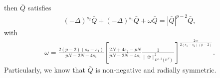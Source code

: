 \documentclass[12pt,a4paper,reqno]{amsart}
\numberwithin{equation}{section}
\begin{document}
then $\bar{Q}$ satisfies
\begin{equation*}
\begin{aligned}
(-\Delta)^{s_{2}}\bar{Q}
+
(-\Delta)^{s_{1}}\bar{Q}
+\omega \bar{Q}
=|\bar{Q}|^{p-2}\bar{Q},
\end{aligned}
\end{equation*}
with
\begin{equation*}
\begin{aligned}
\omega
=
\frac{2(p-2)(s_{2}-s_{1})}{pN-2N-4s_{1}}
\left[
\frac{2N+4s_{2}-pN}{pN-2N-4s_{1}}
\frac{1}{\|\bar{w}\|_{D^{s_{1},2}(\mathbb{R}^{N})}^{2}}
\right]^{\frac{2s_{2}}{2(s_{1}-s_{2})(p-2)}}.
\end{aligned}
\end{equation*}
Particularly, we know that $\bar{Q}$ is non-negative and radially symmetric.
\end{document}
